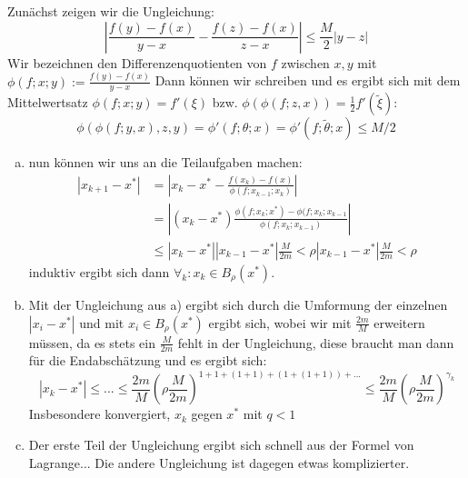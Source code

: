 \documentclass{mywork}
\begin{document}
\begin{aufgabe}
Zunächst zeigen wir die Ungleichung:
\[
|\frac{f(y)-f(x)}{y-x}-\frac{f(z)-f(x)}{z-x}|\le \frac{M}{2} |y-z|
\]
Wir bezeichnen den Differenzenquotienten von $ f $ zwischen $ x,y $ mit $ \phi(f; x; y):= \frac{f(y)-f(x)}{y-x} $ Dann können wir schreiben und es ergibt sich mit dem Mittelwertsatz $ \phi(f;x;y)=f'(\xi) $ bzw. $ \phi(\phi(f;z, x))=\frac{1}{2}f'(\tilde \xi)  $:
\[
\phi(\phi(f;y,x), z, y)=\phi'(f;\theta; x)=\phi'(f; \tilde \theta; x)\le M/2
\]
\begin{enumerate}[a)]
\item nun können wir uns an die Teilaufgaben machen:
\begin{align*}
|x_{k+1}-x^*|&=|x_k-x^*- \frac{f(x_k)-f(x)}{\phi(f; x_{k-1}; x_k)}| \\
&= |(x_k-x^*)\frac{\phi(f; x_k; x^*)-\phi(f; x_k; x_{k-1}}{\phi(f; x_k; x_{k-1})}|\\
&\le |x_k-x^*||x_{k-1}-x^*| \frac{M}{2m} < \rho |x_{k-1}-x^*| \frac{M}{2m} < \rho
\end{align*}
induktiv ergibt sich dann $ \forall_k: x_k \in B_\rho(x^*) $.
\item Mit der Ungleichung aus a) ergibt sich durch die Umformung der einzelnen $ |x_{i}-x^*| $ und mit $ x_{i}\in B_\rho(x^*) $ ergibt sich, wobei wir mit $ \frac{2m}{M} $ erweitern müssen, da es stets ein $\frac{M}{2m}$ fehlt in der Ungleichung, diese braucht man dann für die Endabschätzung und es ergibt sich:
\[
|x_{k}-x^*|\le ... \le \frac{2m}{M} (\rho \frac{M}{2m})^{1+1+(1+1)+(1+(1+1))+...}\le \frac{2m}{M} (\rho \frac{M}{2m})^{\gamma_k}
\] 
Insbesondere konvergiert,  $ x_k $ gegen $ x^* $ mit $ q<1 $
\item Der erste Teil der Ungleichung ergibt sich schnell aus der Formel von Lagrange... Die andere Ungleichung ist dagegen etwas komplizierter.
\end{enumerate}
\end{aufgabe}
\end{document}
